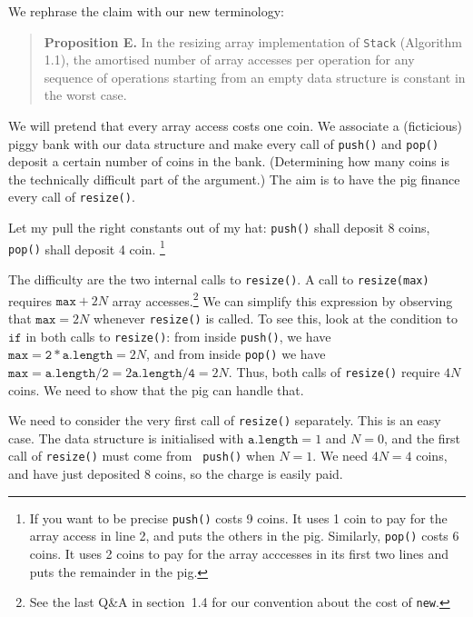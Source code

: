 \documentclass{tufte-handout}
\begin{document}
We rephrase the claim with our new terminology:

   
\begin{quote}{\bf Proposition E.} 
  In the resizing array implementation of {\tt Stack} (Algorithm 1.1),
  the amortised number of array accesses per operation for any
  sequence of operations starting from an empty data structure is
  constant in the worst case.
\end{quote}

We will pretend that every array access costs one coin.  
We associate a (ficticious) piggy bank with our data structure and
make every call of {\tt push()} and {\tt pop()} deposit a certain
number of coins in the bank.  
(Determining how many coins is the technically difficult part of the
argument.) 
The aim is to have the pig finance every call of {\tt resize()}.

Let my pull the right constants out of my hat: {\tt push()} shall
deposit 8 coins, {\tt pop()} shall deposit 4 coin.%
\footnote{If you want to be precise {\tt push()} costs 9 coins. %
  It uses 1 coin to pay for the array access in line 2, and puts the
  others in the pig. %
  Similarly, {\tt pop()} costs 6 coins. %
  It uses 2 coins to pay for the array acccesses in its first two
  lines and puts the remainder in the pig.}

The difficulty are the two internal calls to {\tt resize()}.  
A call to {\tt resize(max)} requires $\mathtt{max}+ 2N$ array
accesses.\footnote{See the last Q\&A in section~1.4 for our convention
  about the cost of {\tt new}.}  
We can simplify this expression by observing that $\mathtt{max}=2N$
whenever {\tt resize()} is called.
To see this, look at the condition to $\mathtt{if}$ in both calls to
\texttt{resize()}: from inside \texttt{push()}, we have $\mathtt{max}=
\mathtt{2*a.length} = 2N$, and from inside \texttt{pop()} we have
$\mathtt{max}= \mathtt{a.length/2}= 2 \mathtt{a.length/4} = 2N$.
Thus, both calls of {\tt resize()} require $4N$ coins.  
We need to show that the pig can handle that.

We need to consider the very first call of {\tt resize()} separately.
This is an easy case.  
The data structure is initialised with $\mathtt{a.length}=1$ and
$N=0$, and the first call of {\tt resize()} must come from {\tt
  push()} when $N=1$.  
We need $4N=4$ coins, and have just deposited $8$ coins, so the charge
is easily paid.
\end{document}
